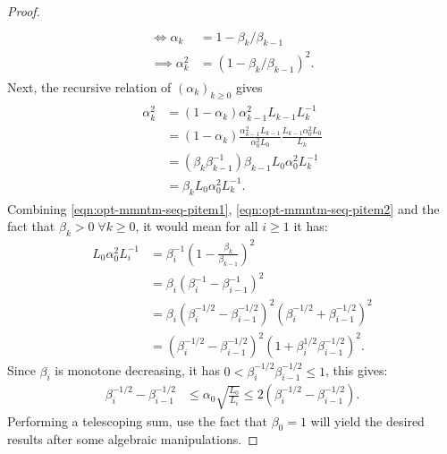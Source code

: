 \documentclass[12pt]{article}
\begin{document}
\begin{proof}
\begin{align}
\begin{split}
                \\
                \iff 
                \alpha_k &= 1 - \beta_k / \beta_{k - 1}
                \\
                \implies 
                \alpha_k^2 &= (1 - \beta_k / \beta_{k - 1})^2.     
            \end{split}\end{align}
            Next, the recursive relation of $(\alpha_k)_{k \ge 0}$ gives
            \begin{align}\label{eqn:opt-mmntm-seq-pitem2}\begin{split}
                \alpha_k^2&= (1 - \alpha_k)\alpha_{k - 1}^2L_{k - 1}L_k^{-1}
                \\
                &= 
                (1 - \alpha_k)
                \frac{\alpha_{k - 1}^2L_{k - 1}}{\alpha_0^2L_0}
                \frac{L_{k - 1}\alpha_0^2L_0}{L_k}
                \\
                &= 
                (\beta_k\beta_{k - 1}^{-1})\beta_{k - 1}L_0\alpha_0^2L_k^{-1}
                \\
                &= \beta_kL_0\alpha_0^2L_k^{-1}.         
            \end{split}\end{align}
            Combining \eqref{eqn:opt-mmntm-seq-pitem1}, \eqref{eqn:opt-mmntm-seq-pitem2} and the fact that $\beta_k > 0\;\forall k \ge 0$, it would mean for all $i \ge 1$ it has: 
            \begin{align*}
                L_0 \alpha_0^2 L_i^{-1} &= 
                \beta_i^{-1}\left(
                    1 - \frac{\beta_k}{\beta_{k - 1}}
                \right)^2
                \\
                &= 
                \beta_i \left(
                    \beta_i^{-1} - \beta_{i - 1}^{-1}
                \right)^2
                \\
                &=
                \beta_i \left(
                    \beta_i^{-1/2} - \beta_{i - 1}^{-1/2}
                \right)^2
                \left(
                    \beta_i^{-1/2} + \beta_{i - 1}^{-1/2}
                \right)^2
                \\
                &= \left(
                    \beta_i^{-1/2} - \beta_{i - 1}^{-1/2}
                \right)^2\left(
                    1 + \beta_i^{1/2}\beta_{i - 1}^{-1/2}
                \right)^2. 
            \end{align*}
            Since $\beta_i$ is monotone decreasing, it has $0 < \beta_i^{-1/2}\beta_{i - 1}^{-1/2} \le 1$, this gives: 
            \begin{align*}
                \beta_i^{-1/2} - \beta_{i - 1}^{-1/2} 
                &\le \alpha_0\sqrt{\frac{L_0}{L_i}} 
                \le 2 \left(
                    \beta_i^{-1/2} - \beta_{i - 1}^{-1/2}
                \right).
            \end{align*}
            Performing a telescoping sum, use the fact that $\beta_0 = 1$ will yield the desired results after some algebraic manipulations. 
        \end{proof}
\end{document}

